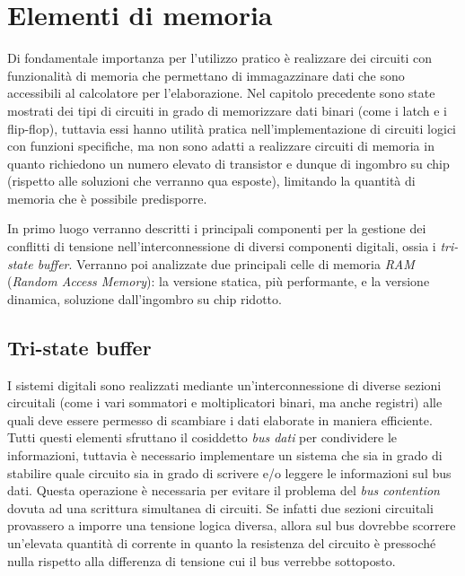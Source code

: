 \chapter{Elementi di memoria}
	Di fondamentale importanza per l'utilizzo pratico è realizzare dei circuiti con funzionalità di memoria che permettano di immagazzinare dati che sono accessibili al calcolatore per l'elaborazione. Nel capitolo precedente sono state mostrati dei tipi di circuiti in grado di memorizzare dati binari (come i latch e i flip-flop), tuttavia essi hanno utilità pratica nell'implementazione di circuiti logici con funzioni specifiche, ma non sono adatti a realizzare circuiti di memoria in quanto richiedono un numero elevato di transistor e dunque di ingombro su chip (rispetto alle soluzioni che verranno qua esposte), limitando la quantità di memoria che è possibile predisporre.
	
	In primo luogo verranno descritti i principali componenti per la gestione dei conflitti di tensione nell'interconnessione di diversi componenti digitali, ossia i \textit{tri-state buffer}. Verranno poi analizzate due principali celle di memoria \textit{RAM} (\textit{Random Access Memory}): la versione statica, più performante, e la versione dinamica, soluzione dall'ingombro su chip ridotto.
	
\section{Tri-state buffer}
	
	I sistemi digitali sono realizzati mediante un'interconnessione di diverse sezioni circuitali (come i vari sommatori e moltiplicatori binari, ma anche registri) alle quali deve essere permesso di scambiare i dati elaborate in maniera efficiente. Tutti questi elementi sfruttano il cosiddetto \textit{bus dati} per condividere le informazioni, tuttavia è necessario implementare un sistema che sia in grado di stabilire quale circuito sia in grado di scrivere e/o leggere le informazioni sul bus dati. Questa operazione è necessaria per evitare il problema del \textit{bus contention} dovuta ad una scrittura simultanea di circuiti. Se infatti due sezioni circuitali provassero a imporre una tensione logica diversa, allora sul bus dovrebbe scorrere un'elevata quantità di corrente in quanto la resistenza del circuito è pressoché nulla rispetto alla differenza di tensione cui il bus verrebbe sottoposto.
	
